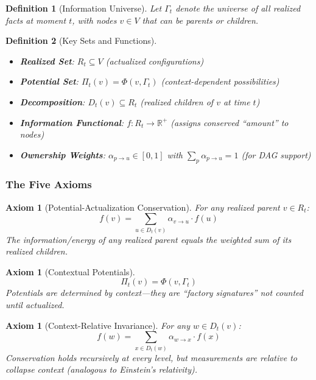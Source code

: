 \documentclass[11pt,a4paper]{article}
\newtheorem{axiom}[theorem]{Axiom}
\newtheorem{definition}{Definition}
\newcommand{\R}{\mathbb{R}}
\begin{document}
\begin{definition}[Information Universe]
Let $\Gamma_t$ denote the universe of all realized facts at moment $t$, with nodes $v \in V$ that can be parents or children.
\end{definition}

\begin{definition}[Key Sets and Functions]
\begin{itemize}
    \item \textbf{Realized Set}: $R_t \subseteq V$ (actualized configurations)
    \item \textbf{Potential Set}: $\Pi_t(v) = \Phi(v, \Gamma_t)$ (context-dependent possibilities)
    \item \textbf{Decomposition}: $D_t(v) \subseteq R_t$ (realized children of $v$ at time $t$)
    \item \textbf{Information Functional}: $f: R_t \to \R^+$ (assigns conserved ``amount'' to nodes)
    \item \textbf{Ownership Weights}: $\alpha_{p \to u} \in [0,1]$ with $\sum_p \alpha_{p \to u} = 1$ (for DAG support)
\end{itemize}
\end{definition}

\subsubsection{The Five Axioms}

\begin{axiom}[Potential-Actualization Conservation]
\label{ax:pac}
For any realized parent $v \in R_t$:
\begin{equation}
f(v) = \sum_{u \in D_t(v)} \alpha_{v \to u} \cdot f(u)
\end{equation}
The information/energy of any realized parent equals the weighted sum of its realized children.
\end{axiom}

\begin{axiom}[Contextual Potentials]
\label{ax:context}
\begin{equation}
\Pi_t(v) = \Phi(v, \Gamma_t)
\end{equation}
Potentials are determined by context---they are ``factory signatures'' not counted until actualized.
\end{axiom}

\begin{axiom}[Context-Relative Invariance]
\label{ax:relativity}
For any $w \in D_t(v)$:
\begin{equation}
f(w) = \sum_{x \in D_t(w)} \alpha_{w \to x} \cdot f(x)
\end{equation}
Conservation holds recursively at every level, but measurements are relative to collapse context (analogous to Einstein's relativity).
\end{axiom}
\end{document}
